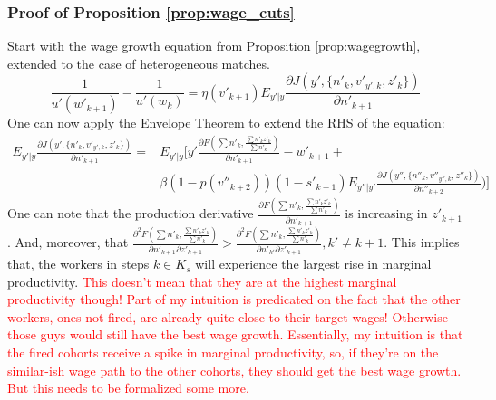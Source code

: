 \subsubsection*{Proof of Proposition \ref{prop:wage_cuts}} \label{proof:wage_cuts}
 Start with the wage growth equation from Proposition \ref{prop:wagegrowth}, extended to the case of heterogeneous matches. 
     \[\frac{1}{u'(w'_{k+1})} - \frac{1}{u'(w_k)} = \eta(v'_{k+1}) E_{y'|y} \frac{\partial J(y',\{n'_k,v'_{y',k},z'_k\})}{\partial n'_{k+1}}\]
     One can now apply the Envelope Theorem to extend the RHS of the equation:
     \begin{align*}
     E_{y'|y} \frac{\partial J(y',\{n'_k,v'_{y',k},z'_k\})}{\partial n'_{k+1}}  = & E_{y'|y}\Big[y'\frac{\partial F(\sum n'_k,\frac{\sum n'_k z'_k}{\sum n'_k})}{\partial n'_{k+1}} - w'_{k+1} + \\
     & \beta (1-p(v''_{k+2}))(1-s'_{k+1})E_{y''|y'} \frac{\partial J(y'',\{n''_k,v''_{y'',k},z''_k\})}{\partial n''_{k+2}})\Big]      
     \end{align*}
     One can note that the production derivative $\frac{\partial F(\sum n'_k,\frac{\sum n'_k z'_k}{\sum n'_k})}{\partial n'_{k+1}}$ is increasing in $z'_{k+1}$. And, moreover, that $\frac{\partial^2 F(\sum n'_k,\frac{\sum n'_k z'_k}{\sum n'_k})}{\partial n'_{k+1} \partial z'_{k+1}}> \frac{\partial^2 F(\sum n'_k,\frac{\sum n'_k z'_k}{\sum n'_k})}{\partial n'_{k'} \partial z'_{k+1}}, k'\neq k+1$. This implies that, the workers in steps $k \in K_s$ will experience the largest rise in marginal productivity. \textcolor{red}{This doesn't mean that they are at the highest marginal productivity though! Part of my intuition is predicated on the fact that the other workers, ones not fired, are already quite close to their target wages! Otherwise those guys would still have the best wage growth. Essentially, my intuition is that the fired cohorts receive a spike in marginal productivity, so, if they're on the similar-ish wage path to the other cohorts, they should get the best wage growth. But this needs to be formalized some more.}

